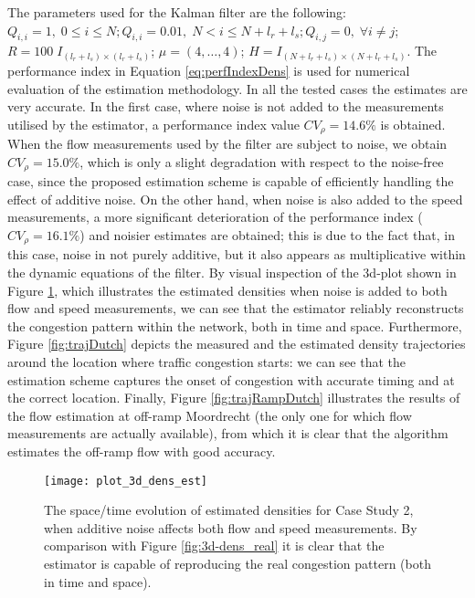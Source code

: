 \documentclass[titlepage,oneside,fleqn,12pt]{article}
\begin{document}
The parameters used for the Kalman filter are the following: $ Q_{i,i}=1, \; 0 \leq i \leq N; Q_{i,i}=0.01, \; N < i \leq N+l_r+l_s; Q_{i,j}=0, \; \forall i \neq j$;  $R=100 \; I_{ \left( l_r+l_s \right) \times \left( l_r+l_s \right) }$; $\mu = \left(4,\ldots,4\right)$; $H=I_{ \left(N+l_r+l_s\right) \times \left(N+l_r+l_s\right) }$.
The performance index in Equation \ref{eq:perfIndexDens} is used for numerical evaluation of the estimation methodology. In all the tested cases the estimates are very accurate. In the first case, where noise is not added to the measurements utilised by the estimator, a performance index value $CV_\rho=14.6\%$ is obtained. When the flow measurements used by the filter are subject to noise, we obtain $CV_\rho=15.0\%$, which is only a slight degradation with respect to the noise-free case, since the proposed estimation scheme is capable of efficiently handling the effect of additive noise. On the other hand, when noise is also added to the speed measurements, a more significant deterioration of the performance index ($CV_\rho=16.1\%$) and noisier estimates are obtained; this is due to the fact that, in this case, noise in not purely additive, but it also appears as multiplicative within the dynamic equations of the filter. By visual inspection of the 3d-plot shown in Figure \ref{fig:3d-dens_est}, which illustrates the estimated densities when noise is added to both flow and speed measurements, we can see that the estimator reliably reconstructs the congestion pattern within the network, both in time and space. Furthermore, Figure \ref{fig:trajDutch} depicts the measured and the estimated density trajectories around the location where traffic congestion starts: we can see that the estimation scheme captures the onset of congestion with accurate timing and at the correct location. Finally, Figure \ref{fig:trajRampDutch} illustrates the results of the flow estimation at off-ramp Moordrecht (the only one for which flow measurements are actually available), from which it is clear that the algorithm estimates the off-ramp flow with good accuracy.

\begin{figure}
\begin{center}
	\texttt{[image: plot\_3d\_dens\_est]}
	\caption{The space/time evolution of estimated densities for Case Study 2, when additive noise affects both flow and speed measurements. By comparison with Figure \ref{fig:3d-dens_real} it is clear that the estimator is capable of reproducing the real congestion pattern (both in time and space).}
	\label{fig:3d-dens_est}
\end{center}
\end{figure}
\end{document}

